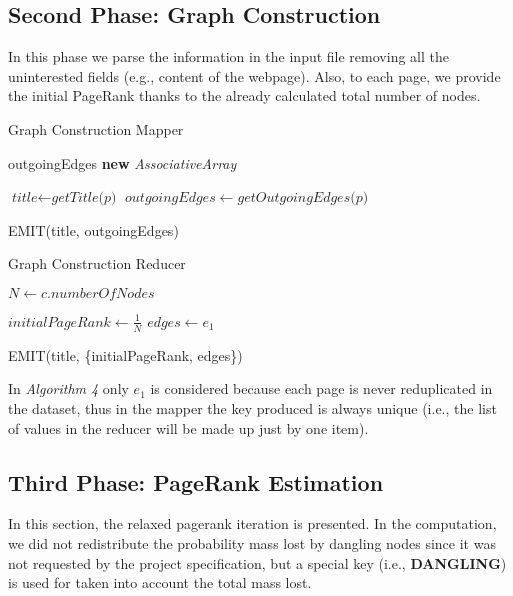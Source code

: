 \subsection{Second Phase: Graph Construction}
In this phase we parse the information in the input file removing all the uninterested fields (e.g., content of the webpage). Also, to each page, we provide the initial PageRank thanks to the already calculated total number of nodes.

\begin{algorithm}[H]
	\caption{Graph Construction Mapper}\label{Mapper}
		\begin{algorithmic}[1]
					\State outgoingEdges \textbf{new} \textit{AssociativeArray}
			
					\State $\textit{title} \gets \textit{getTitle(p)}$
					\State $ outgoingEdges \gets \textit{getOutgoingEdges(p)}$
		
					\State EMIT(title, outgoingEdges)
			\EndProcedure
			
			
	\end{algorithmic}
\end{algorithm}

\begin{algorithm}[H]
	\caption{Graph Construction Reducer}\label{Reducer}
		\begin{algorithmic}[1]
				\State $N \gets c.numberOfNodes$
			\EndProcedure
		
					\State $\textit{initialPageRank} \gets \frac{1}{N} $
					\State $ \textit{edges} \gets e_1$
		
					\State EMIT(title, \{initialPageRank, edges\})
				
			\EndProcedure
		\end{algorithmic}
\end{algorithm}

In \textit{Algorithm 4} only $e_1$ is considered because each page is never reduplicated in the dataset, thus in the mapper the key produced is always unique (i.e., the list of values in the reducer will be made up just by one item).

\subsection{Third Phase: PageRank Estimation}
In this section, the relaxed pagerank iteration is presented. In the computation, we did not redistribute the probability mass lost by dangling nodes since it was not requested by the project specification, but a special key (i.e., \textbf{DANGLING}) is used for taken into account the total mass lost.

